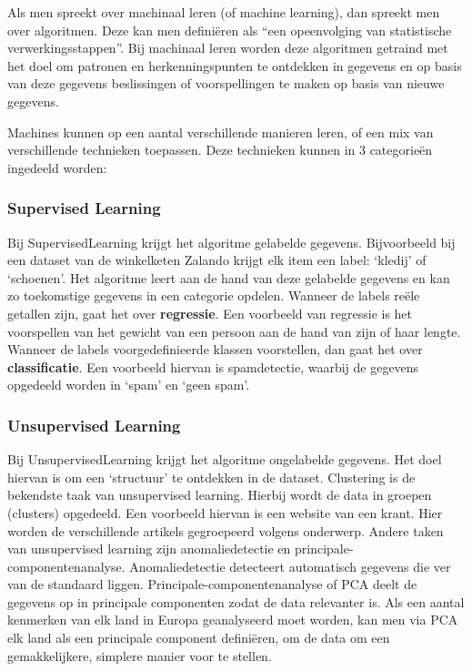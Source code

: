Als men spreekt over machinaal leren (of machine learning), dan spreekt men over algoritmen. Deze kan men definiëren als “een opeenvolging van statistische verwerkingsstappen”. Bij machinaal leren worden deze algoritmen getraind met het doel om patronen en herkenningspunten te ontdekken in gegevens en op basis van deze gegevens beslissingen of voorspellingen te maken op basis van nieuwe gegevens. \autocite{IBM2020a}

Machines kunnen op een aantal verschillende manieren leren, of een mix van verschillende technieken toepassen. Deze technieken kunnen in 3 categorieën ingedeeld worden:

\subsubsection{Supervised Learning}
\label{sec:supervisedlearning}
Bij \gls{SupervisedLearning} krijgt het algoritme gelabelde gegevens. Bijvoorbeeld bij een dataset van de winkelketen Zalando krijgt elk item een label: ‘kledij’ of ‘schoenen’. Het algoritme leert aan de hand van deze gelabelde gegevens en kan zo toekomstige gegevens in een categorie opdelen. Wanneer de labels reële getallen zijn, gaat het over \textbf{regressie}. Een voorbeeld van regressie is het voorspellen van het gewicht van een persoon aan de hand van zijn of haar lengte. Wanneer de labels voorgedefinieerde klassen voorstellen, dan gaat het over \textbf{classificatie}. Een voorbeeld hiervan is spamdetectie, waarbij de gegevens opgedeeld worden in ‘spam’ en ‘geen spam’.\autocite{Lievens2020} 

\subsubsection{Unsupervised Learning}
\label{sec:unsupervisedlearning}
Bij \gls{UnsupervisedLearning} krijgt het algoritme ongelabelde gegevens. Het doel hiervan is om een ‘structuur’ te ontdekken in de dataset. Clustering is de bekendste taak van unsupervised learning. Hierbij wordt de data in groepen (clusters) opgedeeld. Een voorbeeld hiervan is een website van een krant. Hier worden de verschillende artikels gegroepeerd volgens onderwerp. \autocite{Lievens2020}
Andere taken van unsupervised learning zijn anomaliedetectie en principale-componentenanalyse. Anomaliedetectie detecteert automatisch gegevens die ver van de standaard liggen. Principale-componentenanalyse of PCA deelt de gegevens op in principale componenten zodat de data relevanter is. Als een aantal kenmerken van elk land in Europa geanalyseerd moet worden, kan men via PCA elk land als een principale component definiëren, om de data om een gemakkelijkere, simplere manier voor te stellen.

